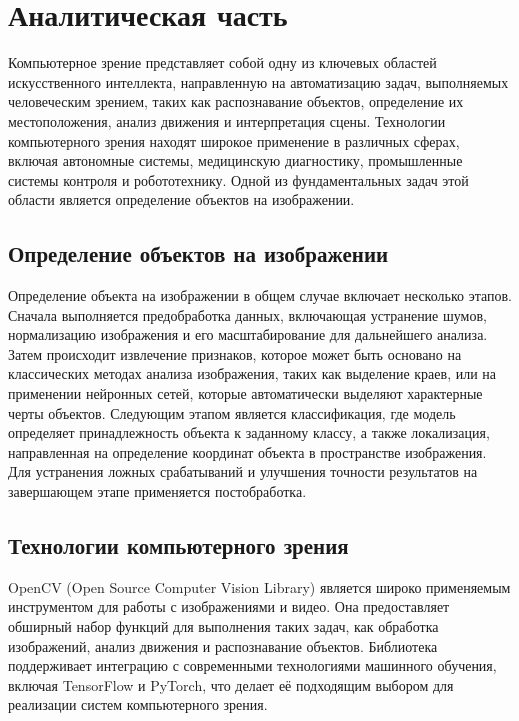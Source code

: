 \chapter{Аналитическая часть}

Компьютерное зрение представляет собой одну из ключевых областей искусственного интеллекта, 
направленную на автоматизацию задач, выполняемых человеческим зрением, таких как распознавание объектов, 
определение их местоположения, анализ движения и интерпретация сцены. 
Технологии компьютерного зрения находят широкое применение в различных сферах, 
включая автономные системы, медицинскую диагностику, промышленные системы контроля и робототехнику. 
Одной из фундаментальных задач этой области является определение объектов на изображении.

\section{Определение объектов на изображении}

Определение объекта на изображении в общем случае включает несколько этапов. 
Сначала выполняется предобработка данных, включающая устранение шумов, 
нормализацию изображения и его масштабирование для дальнейшего анализа. 
Затем происходит извлечение признаков, которое может быть основано на классических методах анализа изображения, 
таких как выделение краев, или на применении нейронных сетей, которые автоматически выделяют характерные черты объектов. 
Следующим этапом является классификация, где модель определяет принадлежность объекта к заданному классу, 
а также локализация, направленная на определение координат объекта в пространстве изображения. 
Для устранения ложных срабатываний и улучшения точности результатов на завершающем этапе применяется постобработка.

\section{Технологии компьютерного зрения}

OpenCV (Open Source Computer Vision Library) является широко применяемым инструментом для работы с изображениями и видео. 
Она предоставляет обширный набор функций для выполнения таких задач, как обработка изображений, анализ движения и распознавание объектов. 
Библиотека поддерживает интеграцию с современными технологиями машинного обучения, включая TensorFlow и PyTorch, 
что делает её подходящим выбором для реализации систем компьютерного зрения.


